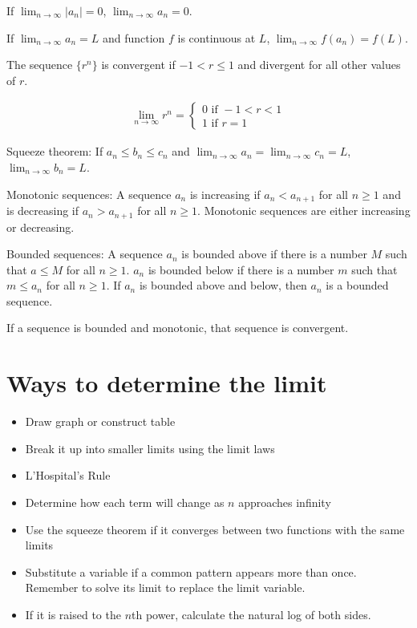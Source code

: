 \documentclass{article}
\begin{document}
If $\lim_{n \to \infty} |a_n| = 0$, $\lim_{n \to \infty} a_n = 0$.

If $\lim_{n \to \infty} a_n = L$ and function $f$ is continuous at $L$, $\lim_{n \to \infty} f(a_n) = f(L)$.

The sequence $\{r^n\}$ is convergent if $-1 < r \leq 1$ and divergent for all other values of $r$.

\begin{gather*}
    \lim_{n \to \infty} r^n = \begin{cases}
        0 \text{ if } -1 < r < 1 \\
        1 \text{ if } r = 1
    \end{cases}
\end{gather*}

Squeeze theorem: If $a_n \leq b_n \leq c_n$ and $\lim_{n \to \infty} a_n = \lim_{n \to \infty} c_n = L$, $\lim_{n \to \infty} b_n = L$.

Monotonic sequences: A sequence ${a_n}$ is increasing if $a_n < a_{n+1}$ for all $n \geq 1$ and is decreasing if $a_n > a_{n+1}$ for all $n \geq 1$. Monotonic sequences are either increasing or decreasing.

Bounded sequences: A sequence ${a_n}$ is bounded above if there is a number $M$ such that $a \leq M$ for all $n \geq 1$. ${a_n}$ is bounded below if there is a number $m$ such that $m \leq a_n$ for all $n \geq 1$. If ${a_n}$ is bounded above and below, then ${a_n}$ is a bounded sequence.

If a sequence is bounded and monotonic, that sequence is convergent.

\section{Ways to determine the limit}

\begin{itemize}
    \item Draw graph or construct table
    \item Break it up into smaller limits using the limit laws
    \item L'Hospital's Rule
    \item Determine how each term will change as $n$ approaches infinity
    \item Use the squeeze theorem if it converges between two functions with the same limits
    \item Substitute a variable if a common pattern appears more than once. Remember to solve its limit to replace the limit variable.
    \item If it is raised to the $n$th power, calculate the natural log of both sides.
\end{itemize}
\end{document}
